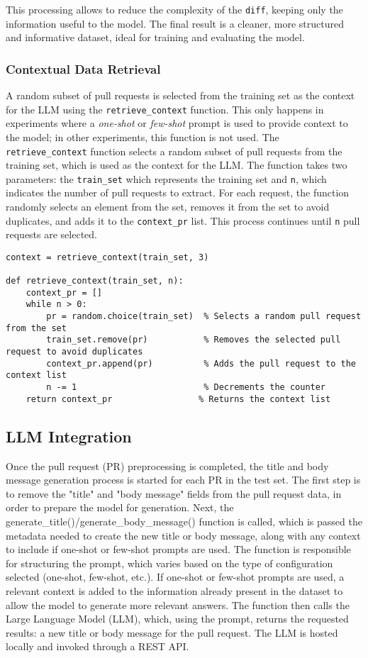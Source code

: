 This processing allows to reduce the complexity of the \texttt{diff}, keeping only the information useful to the model. The final result is a cleaner, more structured and informative dataset, ideal for training and evaluating the model.
\subsubsection{Contextual Data Retrieval}
A random subset of pull requests is selected from the training set as the context for the LLM using the \texttt{retrieve\_context} function. This only happens in experiments where a \textit{one-shot} or \textit{few-shot} prompt is used to provide context to the model; in other experiments, this function is not used.
The \texttt{retrieve\_context} function selects a random subset of pull requests from the training set, which is used as the context for the LLM. The function takes two parameters: the \texttt{train\_set} which represents the training set and \texttt{n}, which indicates the number of pull requests to extract. For each request, the function randomly selects an element from the set, removes it from the set to avoid duplicates, and adds it to the \texttt{context\_pr} list. This process continues until \texttt{n} pull requests are selected.
\begin{verbatim}
context = retrieve_context(train_set, 3)

def retrieve_context(train_set, n):
    context_pr = []
    while n > 0:
        pr = random.choice(train_set)  % Selects a random pull request from the set
        train_set.remove(pr)           % Removes the selected pull request to avoid duplicates
        context_pr.append(pr)          % Adds the pull request to the context list
        n -= 1                         % Decrements the counter
    return context_pr                 % Returns the context list
\end{verbatim}
\subsection{LLM Integration}
Once the pull request (PR) preprocessing is completed, the title and body message generation process is started for each PR in the test set. The first step is to remove the "title" and "body message" fields from the pull request data, in order to prepare the model for generation. Next, the generate\_title()/generate\_body\_message() function is called, which is passed the metadata needed to create the new title or body message, along with any context to include if one-shot or few-shot prompts are used.
The function is responsible for structuring the prompt, which varies based on the type of configuration selected (one-shot, few-shot, etc.). If one-shot or few-shot prompts are used, a relevant context is added to the information already present in the dataset to allow the model to generate more relevant answers. The function then calls the Large Language Model (LLM), which, using the prompt, returns the requested results: a new title or body message for the pull request. The LLM is hosted locally and invoked through a REST API.
